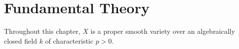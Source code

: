 \documentclass[a4paper,12pt,twoside]{report}
\newcommand{\Z}{\mathbb{Z}}
\newcommand{\Pic}{\mathrm{Pic}}
\newcommand{\Br}{\mathrm{Br}}
\newcommand{\HH}{\mathrm{H}}
\begin{document}




\chapter{Fundamental Theory}\label{Chap1}

Throughout this chapter, $X$ is a proper smooth variety over an algebraically closed field $k$ of characteristic $p>0$. 
\end{document}
